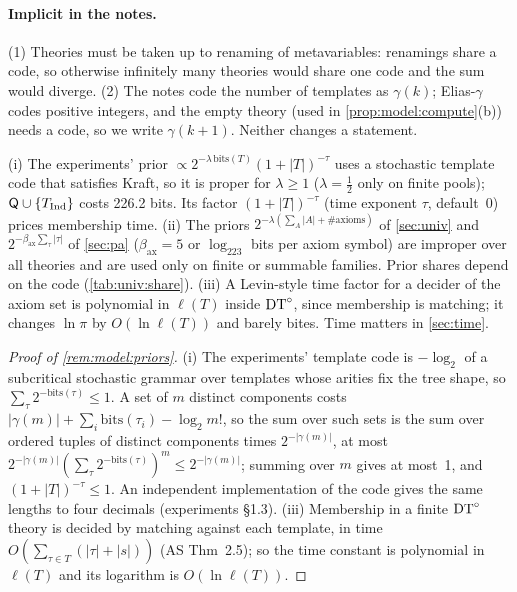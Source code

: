 \paragraph{Implicit in the notes.} (1) Theories must be taken up to renaming of metavariables: renamings share a code, so otherwise infinitely many theories would share one code and the sum would diverge. (2) The notes code the number of templates as $\gamma(k)$; Elias-$\gamma$ codes positive integers, and the empty theory (used in \cref{prop:model:compute}(b)) needs a code, so we write $\gamma(k+1)$. Neither changes a statement.

\begin{remark}\label{rem:model:priors}
(i) The experiments' prior $\propto2^{-\lambda\,\mathrm{bits}(T)}(1+|T|)^{-\tau}$ uses a stochastic template code that satisfies Kraft, so it is proper for $\lambda\ge1$ ($\lambda=\tfrac12$ only on finite pools); $\mathsf{Q}\cup\{T_{\mathrm{Ind}}\}$ costs 226.2 bits. Its factor $(1+|T|)^{-\tau}$ (time exponent $\tau$, default~0) prices membership time.
(ii) The priors $2^{-\lambda(\sum_A|A|+\#\text{axioms})}$ of \cref{sec:univ} and $2^{-\beta_{\mathrm{ax}}\sum_\tau|\tau|}$ of \cref{sec:pa} ($\beta_{\mathrm{ax}}=5$ or $\log_223$ bits per axiom symbol) are improper over all theories and are used only on finite or summable families. Prior shares depend on the code (\cref{tab:univ:share}).
(iii) A Levin-style time factor for a decider of the axiom set is polynomial in $\ell(T)$ inside $\mathrm{DT}^{\circ}$, since membership is matching; it changes $\ln\pi$ by $O(\ln\ell(T))$ and barely bites. Time matters in \cref{sec:time}.
\end{remark}

\begin{proof}[Proof of \cref{rem:model:priors}]
(i) The experiments' template code is $-\log_2$ of a subcritical stochastic grammar over templates whose arities fix the tree shape, so $\sum_\tau2^{-\mathrm{bits}(\tau)}\le1$. A set of $m$ distinct components costs $|\gamma(m)|+\sum_i\mathrm{bits}(\tau_i)-\log_2m!$, so the sum over such sets is the sum over ordered tuples of distinct components times $2^{-|\gamma(m)|}$, at most $2^{-|\gamma(m)|}(\sum_\tau2^{-\mathrm{bits}(\tau)})^m\le2^{-|\gamma(m)|}$; summing over $m$ gives at most~1, and $(1+|T|)^{-\tau}\le1$. An independent implementation of the code gives the same lengths to four decimals (experiments \S1.3). (iii) Membership in a finite $\mathrm{DT}^{\circ}$ theory is decided by matching against each template, in time $O(\sum_{\tau\in T}(|\tau|+|s|))$ (AS Thm~2.5); so the time constant is polynomial in $\ell(T)$ and its logarithm is $O(\ln\ell(T))$.
\end{proof}

